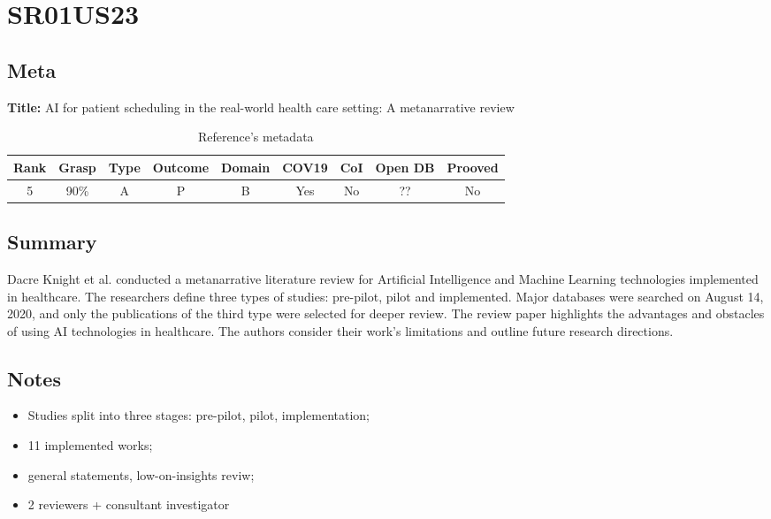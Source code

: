 \section{ SR01US23 }


\subsection{Meta}

    \textbf{Title:}
    AI for patient scheduling in the real-world health care setting: A metanarrative review

    \begin{table}[H]
        \centering
        \begin{tabular}{|c|c|c|c|c|c|c|c|c|}
            \hline
                \textbf{Rank} & \textbf{Grasp} & \textbf{Type} & \textbf{Outcome} & \textbf{Domain} & \textbf{COV19} & \textbf{CoI} & \textbf{Open DB} & \textbf{Prooved} \\
            \hline
                5 & 90\% & A & P & B & Yes & No & ?? & No \\
            \hline
        \end{tabular}
        \caption{Reference's metadata}
        \label{tab:SR01US23}
    \end{table}

\subsection{Summary}
    Dacre Knight et al. \cite{x034} conducted a metanarrative literature review for Artificial Intelligence and Machine Learning technologies implemented in healthcare. The researchers define three types of studies: pre-pilot, pilot and implemented. Major databases were searched on August 14, 2020, and only the publications of the third type were selected for deeper review. The review paper highlights the advantages and obstacles of using AI technologies in healthcare. The authors consider their work's limitations and outline future research directions. 

\subsection{Notes}
    \begin{itemize}
        \item Studies split into three stages: pre-pilot, pilot, implementation;
        \item 11 implemented works;
        \item general statements, low-on-insights reviw;
        \item 2 reviewers + consultant investigator
    \end{itemize}


